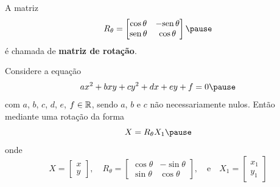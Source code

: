 \documentclass{beamer}
\begin{document}
\begin{frame}
    \begin{definicao}
        A matriz
        \[
            R_\theta = \begin{bmatrix}
                \cos\theta & -\sin\theta \\
                \sin\theta & \cos\theta
            \end{bmatrix}\pause
        \]
        é chamada de \textbf{matriz de rotação}.
    \end{definicao}
\end{frame}

\begin{frame}
    \begin{teorema}
        Considere a equação
        \[
            ax^2 + bxy + cy^2 + dx + ey + f = 0\pause
        \]
        com $a$, $b$, $c$, $d$, $e$, $f \in \mathbb{R}$, \pause sendo $a$, $b$ e $c$ \pause não necessariamente nulos. \pause Então mediante uma rotação da forma
        \[
            X = R_\theta X_1\pause
        \]
        onde
        \[
            X = \begin{bmatrix}
                x \\y
            \end{bmatrix}, \quad
            R_\theta = \begin{bmatrix}
                \cos\theta & -\sin\theta \\
                \sin\theta & \cos\theta
            \end{bmatrix}, \quad\mbox{e}\quad
            X_1 = \begin{bmatrix}
                x_1 \\y_1
            \end{bmatrix}
        \]
    \end{teorema}
\end{frame}
\end{document}
